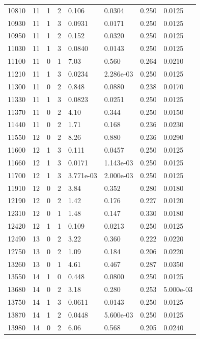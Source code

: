 \documentclass[preview]{standalone}
\begin{document}
{{{{{\begin{tabular}{L{1.2cm}C{1.2cm} C{0.3cm}C{0.5cm} C{1.4cm}C{1.4cm} C{1.4cm}C{1.4cm}}
  10810  &    11  & 1     &  2 &  0.106  & 0.0304  & 0.250 &  0.0125   \\ 
  10930  &    11  & 1     &  3 &  0.0931  & 0.0171  & 0.250 &  0.0125   \\ 
  10950  &    11  & 1     &  2 &  0.152  & 0.0320  & 0.250 &  0.0125   \\ 
  11030  &    11  & 1     &  3 &  0.0840  & 0.0143  & 0.250 &  0.0125   \\ 
  11100  &    11  & 0     &  1 &  7.03  & 0.560  & 0.264 &  0.0210   \\ 
  11210  &    11  & 1     &  3 &  0.0234  & 2.286e-03  & 0.250 &  0.0125   \\ 
  11300  &    11  & 0     &  2 &  0.848  & 0.0880  & 0.238 &  0.0170   \\ 
  11330  &    11  & 1     &  3 &  0.0823  & 0.0251  & 0.250 &  0.0125   \\ 
  11370  &    11  & 0     &  2 &  4.10  & 0.344  & 0.250 &  0.0150   \\ 
  11440  &    11  & 0     &  2 &  1.71  & 0.168  & 0.236 &  0.0230   \\ 
  11550  &    12  & 0     &  2 &  8.26  & 0.880  & 0.236 &  0.0290   \\ 
  11600  &    12  & 1     &  3 &  0.111  & 0.0457  & 0.250 &  0.0125   \\ 
  11660  &    12  & 1     &  3 &  0.0171  & 1.143e-03  & 0.250 &  0.0125   \\ 
  11700  &    12  & 1     &  3 &  3.771e-03  & 2.000e-03  & 0.250 &  0.0125   \\ 
  11910  &    12  & 0     &  2 &  3.84  & 0.352  & 0.280 &  0.0180   \\ 
  12190  &    12  & 0     &  2 &  1.42  & 0.176  & 0.227 &  0.0120   \\ 
  12310  &    12  & 0     &  1 &  1.48  & 0.147  & 0.330 &  0.0180   \\ 
  12420  &    12  & 1     &  1 &  0.109  & 0.0213  & 0.250 &  0.0125   \\ 
  12490  &    13  & 0     &  2 &  3.22  & 0.360  & 0.222 &  0.0220   \\ 
  12750  &    13  & 0     &  2 &  1.09  & 0.184  & 0.206 &  0.0220   \\ 
  13260  &    13  & 0     &  1 &  4.61  & 0.467  & 0.287 &  0.0350   \\ 
  13550  &    14  & 1     &  0 &  0.448  & 0.0800  & 0.250 &  0.0125   \\ 
  13680  &    14  & 0     &  2 &  3.18  & 0.280  & 0.253 &  5.000e-03   \\ 
  13750  &    14  & 1     &  3 &  0.0611  & 0.0143  & 0.250 &  0.0125   \\ 
  13870  &    14  & 1     &  2 &  0.0448  & 5.600e-03  & 0.250 &  0.0125   \\ 
  13980  &    14  & 0     &  2 &  6.06  & 0.568  & 0.205 &  0.0240   \\ 
\hline 
\end{tabular} 

}}}}}
\end{document}
